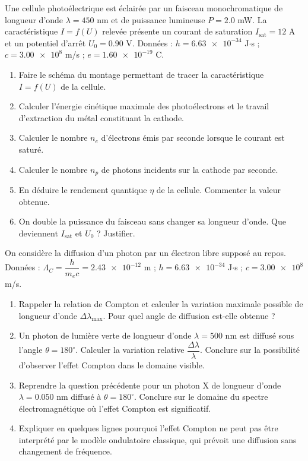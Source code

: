 \documentclass[11pt]{article}
\providecommand{\degree}{^{\circ}}
\begin{document}
\begin{exercice}[Exploitation d'une caractéristique $I = f(U)$]
Une cellule photoélectrique est éclairée par un faisceau monochromatique de longueur d'onde $\lambda = \num{450}$ nm et de puissance lumineuse $P = \num{2,0}$ mW. La caractéristique $I = f(U)$ relevée présente un courant de saturation $I_{\text{sat}} = \num{12}$ \textmu A et un potentiel d'arrêt $U_0 = \num{0,90}$ V.
Données : $h = \num{6,63e-34}$ J$\cdot$s ; $c = \num{3,00e8}$ m/s ; $e = \num{1,60e-19}$ C.
\begin{enumerate}
\item Faire le schéma du montage permettant de tracer la caractéristique $I = f(U)$ de la cellule.
\item Calculer l'énergie cinétique maximale des photoélectrons et le travail d'extraction du métal constituant la cathode.
\item Calculer le nombre $n_e$ d'électrons émis par seconde lorsque le courant est saturé.
\item Calculer le nombre $n_p$ de photons incidents sur la cathode par seconde.
\item En déduire le rendement quantique $\eta$ de la cellule. Commenter la valeur obtenue.
\item On double la puissance du faisceau sans changer sa longueur d'onde. Que deviennent $I_{\text{sat}}$ et $U_0$ ? Justifier.
\end{enumerate}
\end{exercice}

\begin{exercice}
On considère la diffusion d'un photon par un électron libre supposé au repos.
Données : $\Lambda_C = \dfrac{h}{m_e c} = \num{2,43e-12}$ m ; $h = \num{6,63e-34}$ J$\cdot$s ; $c = \num{3,00e8}$ m/s.
\begin{enumerate}
\item Rappeler la relation de Compton et calculer la variation maximale possible de longueur d'onde $\Delta\lambda_{\max}$. Pour quel angle de diffusion est-elle obtenue ?
\item Un photon de lumière verte de longueur d'onde $\lambda = \num{500}$ nm est diffusé sous l'angle $\theta = 180\degree$. Calculer la variation relative $\dfrac{\Delta\lambda}{\lambda}$. Conclure sur la possibilité d'observer l'effet Compton dans le domaine visible.
\item Reprendre la question précédente pour un photon X de longueur d'onde $\lambda = \num{0,050}$ nm diffusé à $\theta = 180\degree$. Conclure sur le domaine du spectre électromagnétique où l'effet Compton est significatif.
\item Expliquer en quelques lignes pourquoi l'effet Compton ne peut pas être interprété par le modèle ondulatoire classique, qui prévoit une diffusion sans changement de fréquence.
\end{enumerate}
\end{exercice}
\end{document}
